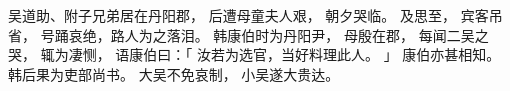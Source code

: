 
\switchcolumn*[\section{}]

吴道助、附子兄弟居在丹阳郡，
后遭母童夫人艰，
朝夕哭临。
及思至，
宾客吊省，
号踊哀绝，路人为之落泪。
韩康伯时为丹阳尹，
母殷在郡，
每闻二吴之哭，
辄为凄恻，
语康伯曰：「
    汝若为选官，当好料理此人。
」
康伯亦甚相知。
韩后果为吏部尚书。
大吴不免哀制，
小吴遂大贵达。

\switchcolumn



